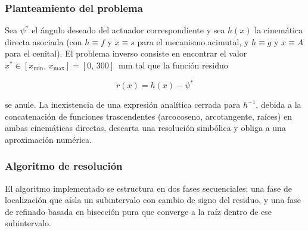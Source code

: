 \subsubsection{Planteamiento del problema}
Sea $\psi^{*}$ el ángulo deseado del actuador correspondiente y sea $h(x)$ la cinemática directa asociada (con $h \equiv f$ y $x \equiv s$ para el mecanismo acimutal, y $h \equiv g$ y $x \equiv A$ para el cenital). El problema inverso consiste en encontrar el valor $x^{*} \in [x_{\min},\,x_{\max}] = [0,\,300]$~mm tal que la función residuo

\begin{equation}
    r(x) = h(x) - \psi^{*}
    \label{eq:residuo_unificado}
\end{equation}

se anule. La inexistencia de una expresión analítica cerrada para $h^{-1}$, debida a la concatenación de funciones trascendentes (arcocoseno, arcotangente, raíces) en ambas cinemáticas directas, descarta una resolución simbólica y obliga a una aproximación numérica.

\subsubsection{Algoritmo de resolución}
El algoritmo implementado se estructura en dos fases secuenciales: una fase de localización que aísla un subintervalo con cambio de signo del residuo, y una fase de refinado basada en bisección pura que converge a la raíz dentro de ese subintervalo.

